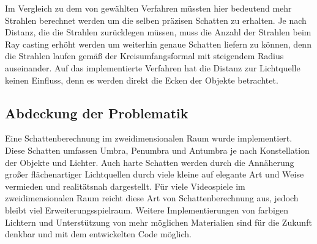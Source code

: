 Im Vergleich zu dem von gewählten Verfahren müssten hier bedeutend mehr Strahlen berechnet werden um die
selben präzisen Schatten zu erhalten. Je nach Distanz, die die Strahlen zurücklegen müssen, muss die Anzahl
der Strahlen beim Ray casting erhöht werden um weiterhin genaue Schatten liefern zu können, denn die Strahlen
laufen gemäß der Kreisumfangsformal mit steigendem Radius auseinander. Auf das implementierte Verfahren hat
die Distanz zur Lichtquelle keinen Einfluss, denn es werden direkt die Ecken der Objekte betrachtet.

\subsection{Abdeckung der Problematik}

Eine Schattenberechnung im zweidimensionalen Raum wurde implementiert. Diese Schatten umfassen Umbra, Penumbra
und Antumbra je nach Konstellation der Objekte und Lichter. Auch harte Schatten werden durch die Annäherung
großer flächenartiger Lichtquellen durch viele kleine auf elegante Art und Weise vermieden und realitätsnah
dargestellt. Für viele Videospiele im zweidimensionalen Raum reicht diese Art von Schattenberechnung aus,
jedoch bleibt viel Erweiterungsspielraum. Weitere Implementierungen von farbigen Lichtern und Unterstützung
von mehr möglichen Materialien sind für die Zukunft denkbar und mit dem entwickelten Code möglich.
